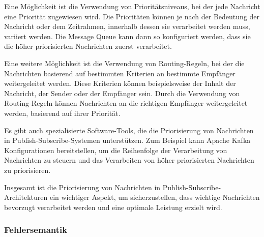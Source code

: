 Eine Möglichkeit ist die Verwendung von Prioritätsniveaus, bei der jede Nachricht eine Priorität zugewiesen wird. Die Prioritäten können je nach der Bedeutung der Nachricht oder dem Zeitrahmen, innerhalb dessen sie verarbeitet werden muss, variiert werden. Die Message Queue kann dann so konfiguriert werden, dass sie die höher priorisierten Nachrichten zuerst verarbeitet.

Eine weitere Möglichkeit ist die Verwendung von Routing-Regeln, bei der die Nachrichten basierend auf bestimmten Kriterien an bestimmte Empfänger weitergeleitet werden. Diese Kriterien können beispielsweise der Inhalt der Nachricht, der Sender oder der Empfänger sein. Durch die Verwendung von Routing-Regeln können Nachrichten an die richtigen Empfänger weitergeleitet werden, basierend auf ihrer Priorität.

Es gibt auch spezialisierte Software-Tools, die die Priorisierung von Nachrichten in Publish-Subscribe-Systemen unterstützen. Zum Beispiel kann Apache Kafka Konfigurationen bereitstellen, um die Reihenfolge der Verarbeitung von Nachrichten zu steuern und das Verarbeiten von höher priorisierten Nachrichten zu priorisieren.

Insgesamt ist die Priorisierung von Nachrichten in Publish-Subscribe-Architekturen ein wichtiger Aspekt, um sicherzustellen, dass wichtige Nachrichten bevorzugt verarbeitet werden und eine optimale Leistung erzielt wird.

\subsubsection{Fehlersemantik}


